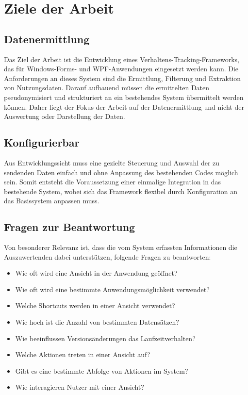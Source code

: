 \section{Ziele der Arbeit}

\subsection{Datenermittlung}
Das Ziel der Arbeit ist die Entwicklung eines Verhaltens-Tracking-Frameworks, das für Windows-Forms- und WPF-Anwendungen eingesetzt werden kann. Die Anforderungen an dieses System sind die Ermittlung, Filterung und Extraktion von Nutzungsdaten. Darauf aufbauend müssen die ermittelten Daten pseudonymisiert und strukturiert an ein bestehendes System übermittelt werden können. Daher liegt der Fokus der Arbeit auf der Datenermittlung und nicht der Auswertung oder Darstellung der Daten.

\subsection{Konfigurierbar}
Aus Entwicklungssicht muss eine gezielte Steuerung und Auswahl der zu sendenden Daten einfach und ohne Anpassung des bestehenden Codes möglich sein. Somit entsteht die Voraussetzung einer einmalige Integration in das bestehende System, wobei sich das Framework flexibel durch Konfiguration an das Basissystem anpassen muss.

\subsection{Fragen zur Beantwortung}
\label{subsec:initial_questions}
Von besonderer Relevanz ist, dass die vom System erfassten Informationen die Auszuwertenden dabei unterstützen, folgende Fragen zu beantworten:

\begin{itemize}
    \item Wie oft wird eine Ansicht in der Anwendung geöffnet?
    \item Wie oft wird eine bestimmte Anwendungsmöglichkeit verwendet?
    \item Welche Shortcuts werden in einer Ansicht verwendet?
    \item Wie hoch ist die Anzahl von bestimmten Datensätzen?
    \item Wie beeinflussen Versionsänderungen das Laufzeitverhalten?
    \item Welche Aktionen treten in einer Ansicht auf?
    \item Gibt es eine bestimmte Abfolge von Aktionen im System?
    \item Wie interagieren Nutzer mit einer Ansicht?
\end{itemize}

